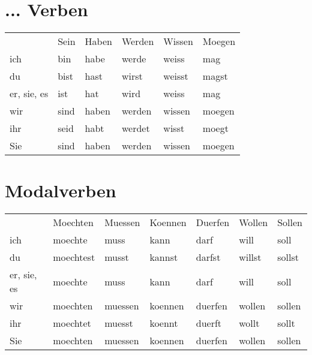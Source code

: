 \begin{appendix}
 \section{ ... Verben}
 \begin{tabular}{l l l l l l}
  & \gls{Sein} & \gls{Haben} & \gls{Werden} & \gls{Wissen} & \gls{Moegen} \\
  ich & bin & habe & werde & weiss & mag \\
  du & bist & hast & wirst & weisst & magst \\
  er, sie, es & ist & hat & wird & weiss & mag \\
  wir & sind & haben & werden & wissen & moegen \\
  ihr & seid & habt & werdet & wisst & moegt \\
  Sie & sind & haben & werden & wissen & moegen \\
 \end{tabular}

 
 \section{Modalverben}
 
 \begin{tabular}{l l l l l l l}
  & \gls{Moechten} & \gls{Muessen} & \gls{Koennen} & \gls{Duerfen} & \gls{Wollen} & \gls{Sollen} \\
  ich & moechte & muss & kann & darf & will & soll \\
  du & moechtest & musst & kannst & darfst & willst & sollst \\
  er, sie, es & moechte & muss & kann & darf & will & soll \\
  wir & moechten & muessen & koennen & duerfen & wollen & sollen \\
  ihr & moechtet & muesst & koennt & duerft & wollt & sollt \\
  Sie & moechten & muessen & koennen & duerfen & wollen & sollen \\
 \end{tabular}

 
 
\end{appendix}
